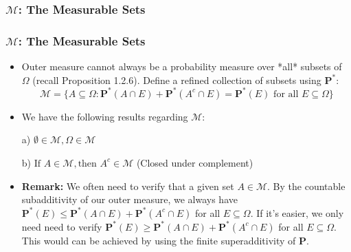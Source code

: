 \documentclass[%
]{beamer}
\newcommand{\BP}{\mathbf{P}}
\begin{document}
\subsubsection{$\mathcal{M}$: The Measurable Sets   }
\frame
{
  \frametitle{$\mathcal{M}$: The Measurable Sets}

   \begin{itemize}

            \item<1-> Outer measure cannot always be a probability measure over *all* subsets of $\Omega$ (recall Proposition 1.2.6). Define a refined collection of subsets using $\BP^*$:
                        $$\mathcal{M}=\{A\subseteq \Omega : \BP^*(A\cap E)+\BP^*(A^c\cap E)=\BP^*(E) \text{ for all }E\subseteq \Omega \}$$
                       
                       
\item<2->   [] \begin{Lemma} We have the following results regarding $\mathcal{M}$:
       
       a) $\emptyset \in \mathcal{M}, \Omega \in \mathcal{M}$
       
       b) $\text{If } A \in \mathcal{M}, \text{then } A^c \in \mathcal{M}$ (Closed under complement)

        \end{Lemma}  
           
           
           \item<3->   \textbf{Remark:} We often need to verify that a given set $A\in \mathcal{M}$. By the countable subadditivity of our outer measure, we always have $\BP^*(E) \leq \BP^*(A\cap E)+\BP^*(A^c\cap E)$ for all $E\subseteq \Omega$. If it's easier, we only need need to verify  $\BP^*(E) \geq \BP^*(A\cap E)+\BP^*(A^c\cap E)$ for all $E\subseteq \Omega$. This would can be achieved by using the finite superadditivity of $\BP$. 
               
                 \end{itemize}
}
\end{document}
